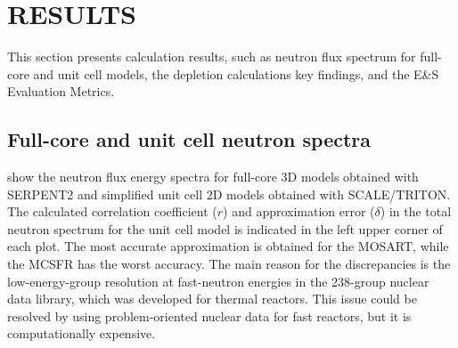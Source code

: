 \documentclass[letterpaper]{mandc2019}
\begin{document}
\section{RESULTS}
This section presents calculation results, such as neutron flux spectrum for full-core and unit cell models, the depletion calculations key findings, and the E\&S Evaluation Metrics.
\subsection{Full-core and unit cell neutron spectra}
\label{sec:spectrum}
 show the neutron flux energy spectra for full-core 3D models obtained with SERPENT2 and simplified unit cell 2D models obtained with SCALE/TRITON. The calculated correlation coefficient ($r$) and approximation error ($\delta$) in the total neutron spectrum for the unit cell model is indicated in the left upper corner of each plot. The most accurate approximation is obtained for the \gls{MOSART}, while the \gls{MCSFR} has the worst accuracy. The main reason for the discrepancies is the low-energy-group resolution at fast-neutron energies in the 238-group nuclear data library, which was developed for thermal reactors. This issue could be resolved by using problem-oriented nuclear data for fast reactors, but it is computationally expensive.
\end{document}
